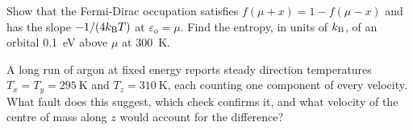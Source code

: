 \begin{exercise}
\label{ex:sm-fermi}
Show that the Fermi-Dirac occupation satisfies $f(\mu + x) = 1 - f(\mu -
x)$ and has the slope $-1/(4k_{\mathrm{B}} T)$ at $\varepsilon_{\mathrm o} = \mu$. Find the
entropy, in units of $k_{\mathrm{B}}$, of an orbital \SI{0.1}{\electronvolt} above
$\mu$ at \SI{300}{\kelvin}.
\end{exercise}

\begin{exercise}[a diagnosis]
\label{ex:sm-diagnose}
A long run of argon at fixed energy reports steady direction
temperatures $T_x = T_y = \SI{295}{\kelvin}$ and $T_z =
\SI{310}{\kelvin}$, each counting one component of every velocity. What
fault does this suggest, which check confirms it, and what velocity of
the centre of mass along $z$ would account for the difference?
\end{exercise}

